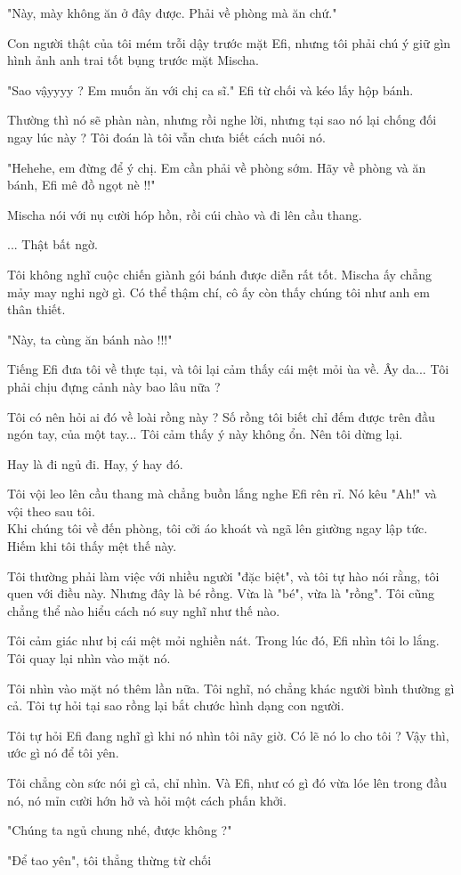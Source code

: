  "Này, mày không ăn ở đây được. Phải về phòng mà ăn chứ."
 
 Con người thật của tôi mém trỗi dậy trước mặt Efi, nhưng tôi phải chú ý giữ gìn hình ảnh anh trai tốt bụng trước mặt Mischa.
 
 "Sao vậyyyy ? Em muốn ăn với chị ca sĩ." Efi từ chối và kéo lấy hộp bánh.
 
 Thường thì nó sẽ phàn nàn, nhưng rồi nghe lời, nhưng tại sao nó lại chống đối ngay lúc này ? Tôi đoán là tôi vẫn chưa biết cách nuôi nó.
 
 "Hehehe, em đừng để ý chị. Em cần phải về phòng sớm. Hãy về phòng và ăn bánh, Efi mê đồ ngọt nè !!"
 
 Mischa nói với nụ cười hóp hồn, rồi cúi chào và đi lên cầu thang.
 
 ... Thật bất ngờ.
 
 Tôi không nghĩ cuộc chiến giành gói bánh được diễn rất tốt. Mischa ấy chẳng mảy may nghi ngờ gì. Có thể thậm chí, cô ấy còn thấy chúng tôi như anh em thân thiết.
 
 "Này, ta cùng ăn bánh nào !!!"
 
 Tiếng Efi đưa tôi về thực tại, và tôi lại cảm thấy cái mệt mỏi ùa về. Ây da... Tôi phải chịu đựng cảnh này bao lâu nữa ?
 
 Tôi có nên hỏi ai đó về loài rồng này ? Số rồng tôi biết chỉ đếm được trên đầu ngón tay, của một tay... Tôi cảm thấy ý này không ổn. Nên tôi dừng lại.
 
 Hay là đi ngủ đi. Hay, ý hay đó.
 
 Tôi vội leo lên cầu thang mà chẳng buồn lắng nghe Efi rên rỉ. Nó kêu "Ah!" và vội theo sau tôi.\\
 
 
 Khi chúng tôi về đến phòng, tôi cởi áo khoát và ngã lên giường ngay lập tức. Hiếm khi tôi thấy mệt thế này.
 
 Tôi thường phải làm việc với nhiều người "đặc biệt", và tôi tự hào nói rằng, tôi quen với điều này. Nhưng đây là bé rồng. Vừa là "bé", vừa là "rồng". Tôi cũng chẳng thể nào hiểu cách nó suy nghĩ như thế nào.
 
 Tôi cảm giác như bị cái mệt mỏi nghiền nát. Trong lúc đó, Efi nhìn tôi lo lắng. Tôi quay lại nhìn vào mặt nó. 
 
 Tôi nhìn vào mặt nó thêm lần nữa. Tôi nghĩ, nó chẳng khác người bình thường gì cả. Tôi tự hỏi tại sao rồng lại bắt chước hình dạng con người.
 
 Tôi tự hỏi Efi đang nghĩ gì khi nó nhìn tôi nãy giờ. Có lẽ nó lo cho tôi ? Vậy thì, ước gì nó để tôi yên.
 
 Tôi chẳng còn sức nói gì cả, chỉ nhìn. Và Efi, như có gì đó vừa lóe lên trong đầu nó, nó mỉn cười hớn hở và hỏi một cách phấn khởi.
 
 "Chúng ta ngủ chung nhé, được không ?"
 
 "Để tao yên", tôi thẳng thừng từ chối
 
 
 
 













